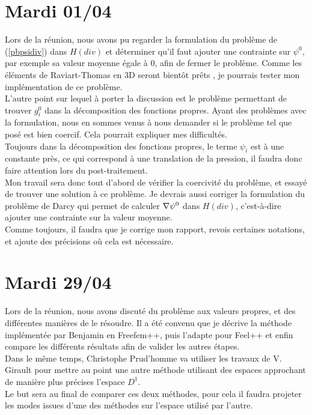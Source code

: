 \section{Mardi 01/04}

Lors de la réunion, nous avons pu regarder la formulation du problème de (\ref{pbpsidiv}) dans $H(div)$ et déterminer qu’il faut ajouter une contrainte sur $\psi^0$, par exemple sa valeur moyenne égale à 0, afin de fermer le problème. Comme les éléments de Raviart-Thomas en 3D seront bientôt prêts , je pourrais tester mon implémentation de ce problème.\\
L’autre point sur lequel à porter la discussion est le problème permettant de trouver $g_i^0$ dans la décomposition des fonctions propres. Ayant des problèmes avec la formulation, nous en sommes venus à nous demander si le problème tel que posé est bien coercif. Cela pourrait expliquer mes difficultés.\\
Toujours dans la décomposition des fonctions propres, le terme $\psi_i$ est à une constante près, ce qui correspond à une translation de la pression, il faudra donc faire attention lors du post-traitement.\\

Mon travail sera donc tout d’abord de vérifier la coercivité du problème, et essayé de trouver une solution à ce problème. Je devrais aussi corriger la formulation du problème de Darcy qui permet de calculer ${\nabla}\psi^0$ dans $H(div)$, c’est-à-dire ajouter une contrainte sur la valeur moyenne.\\
Comme toujours, il faudra que je corrige mon rapport, revois certaines notations, et ajoute des précisions où cela est nécessaire.

\section{Mardi 29/04}

Lors de la réunion, nous avons discuté du problème aux valeurs propres, et des différentes manières de le résoudre. Il a été convenu que je décrive la méthode implémentée par Benjamin en Freefem++, puis l'adapte pour Feel++ et enfin compare les différents résultats afin de valider les autres étapes.\\
Dans le même temps, Christophe Prud'homme va utiliser les travaux de V. Girault \cite{girault90-1} pour mettre au point une autre méthode utilisant des espaces approchant de manière plus précises l'espace $D^1$.\\
Le but sera au final de comparer ces deux méthodes, pour cela il faudra projeter les modes issues d'une des méthodes sur l'espace utilisé par l'autre.\\

